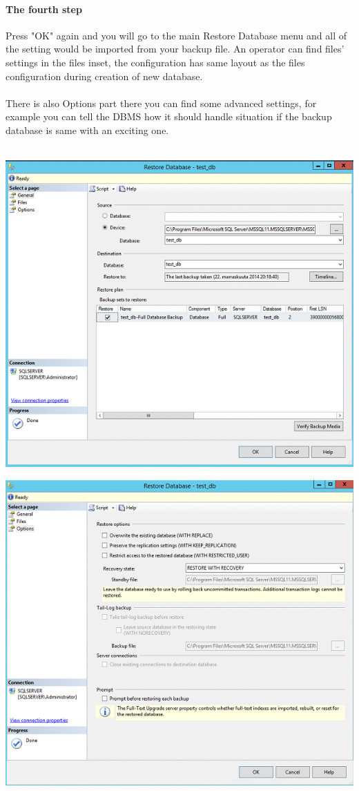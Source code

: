 \documentclass[english]{article}
\begin{document}
\paragraph{The fourth step} Press "OK" again and you will go to the main Restore Database menu and all of the setting would be imported from your backup file. An operator can find files' settings in the files inset, the configuration has same layout as the files configuration during creation of new database.
\\\\
There is also Options part there you can find some advanced settings, for example you can tell the DBMS how it should handle situation if the backup database is same with an exciting one.\\\\
\centerline{\includegraphics[scale=0.8]{administration/8}}
\centerline{\includegraphics[scale=0.8]{administration/9}}
\end{document}
